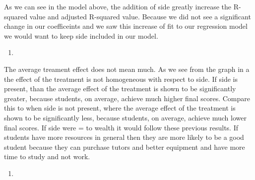 \documentclass[
  12pt,
  landscape]{article}
\begin{document}
As we can see in the model above, the addition of side greatly increase
the R-squared value and adjusted R-squared value. Because we did not see
a significant change in our coefficeints and we saw this increase of fit
to our regression model we would want to keep side included in our
model.

\begin{enumerate}
\def\labelenumi{(\alph{enumi})}
\setcounter{enumi}{17}
\item
\end{enumerate}

The average treament effect does not mean much. As we see from the graph
in a the effect of the treatment is not homogeneous with respect to
side. If side is present, than the average effect of the treatment is
shown to be significantly greater, because students, on average, achieve
much higher final scores. Compare this to when side is not present,
where the average effect of the treatment is shown to be significantly
less, because students, on average, achieve much lower final scores. If
side were = to wealth it would follow these previous results. If
students have more resources in general then they are more likely to be
a good student because they can purchase tutors and better equipment and
have more time to study and not work.

\begin{enumerate}
\def\labelenumi{(\alph{enumi})}
\setcounter{enumi}{18}
\item
\end{enumerate}
\end{document}
